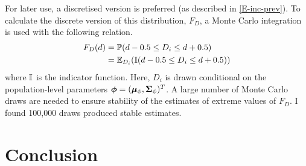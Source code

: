 \documentclass[thesis.tex]{subfiles}
\begin{document}
For later use, a discretised version is preferred (as described in \cref{E-inc-prev}).
To calculate the discrete version of this distribution, $F_D$, a Monte Carlo integration is used with the following relation.
\begin{align}
  F_D(d)
  &= \operatorname{\mathbb{P}}(d - 0.5 \leq D_i \leq d + 0.5) \\
  &= \operatorname{\mathbb{E}}_{D_i}(\operatorname{\mathbb{I}}(d - 0.5 \leq D_i \leq d + 0.5)) 
\end{align}
where $\operatorname{\mathbb{I}}$ is the indicator function.
Here, $D_i$ is drawn conditional on the population-level parameters $\bm{\phi} = (\bm{\mu}_\phi, \bm{\Sigma}_\phi)^T$.
A large number of Monte Carlo draws are needed to ensure stability of the estimates of extreme values of $F_D$.
I found 100,000 draws produced stable estimates.

\section{Conclusion}

\ifSubfilesClassLoaded{
  \appendix
  
  
  \listoftodos
}{}
\end{document}
